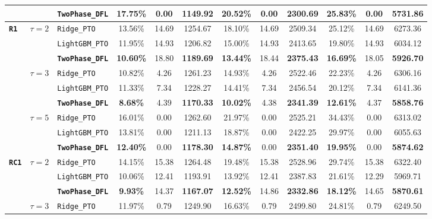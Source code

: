 \documentclass[11pt,a4paper]{article}
\theoremstyle{definition}
\theoremstyle{remark}
\begin{document}
\begin{table}[H]
{\begin{tabular}{@{}lllccccccccc@{}}
 & & \textbf{\texttt{TwoPhase\_DFL}} & \textbf{17.75\%} & 0.00 & \textbf{1149.92} & \textbf{20.52\%} & 0.00 & \textbf{2300.69} & \textbf{25.83\%} & 0.00 & \textbf{5731.86} \\
\midrule
\multirow{9}{*}{\textbf{\texttt{R1}}}
 & \multirow{3}{*}{$\tau = 2$}
 & \texttt{Ridge\_PTO} & 13.56\% & 14.69 & 1254.67 & 18.10\% & 14.69 & 2509.34 & 25.12\% & 14.69 & 6273.36 \\
 & & \texttt{LightGBM\_PTO} & 11.95\% & 14.93 & 1206.82 & 15.00\% & 14.93 & 2413.65 & 19.80\% & 14.93 & 6034.12 \\
 & & \textbf{\texttt{TwoPhase\_DFL}} & \textbf{10.60\%} & 18.80 & \textbf{1189.69} & \textbf{13.44\%} & 18.44 & \textbf{2375.43} & \textbf{16.69\%} & 18.05 & \textbf{5926.70} \\
\cmidrule(lr){2-12}
 & \multirow{3}{*}{$\tau = 3$}
 & \texttt{Ridge\_PTO} & 10.82\% & 4.26 & 1261.23 & 14.93\% & 4.26 & 2522.46 & 22.23\% & 4.26 & 6306.16 \\
 & & \texttt{LightGBM\_PTO} & 11.33\% & 7.34 & 1228.27 & 14.41\% & 7.34 & 2456.54 & 20.12\% & 7.34 & 6141.36 \\
 & & \textbf{\texttt{TwoPhase\_DFL}} & \textbf{8.68\%} & 4.39 & \textbf{1170.33} & \textbf{10.02\%} & 4.38 & \textbf{2341.39} & \textbf{12.61\%} & 4.37 & \textbf{5858.76} \\
\cmidrule(lr){2-12}
 & \multirow{3}{*}{$\tau = 5$}
 & \texttt{Ridge\_PTO} & 16.01\% & 0.00 & 1262.60 & 21.97\% & 0.00 & 2525.21 & 34.43\% & 0.00 & 6313.02 \\
 & & \texttt{LightGBM\_PTO} & 13.81\% & 0.00 & 1211.13 & 18.87\% & 0.00 & 2422.25 & 29.97\% & 0.00 & 6055.63 \\
 & & \textbf{\texttt{TwoPhase\_DFL}} & \textbf{12.40\%} & 0.00 & \textbf{1178.30} & \textbf{14.87\%} & 0.00 & \textbf{2351.40} & \textbf{19.95\%} & 0.00 & \textbf{5874.62} \\
\midrule
\multirow{9}{*}{\textbf{\texttt{RC1}}}
 & \multirow{3}{*}{$\tau = 2$}
 & \texttt{Ridge\_PTO} & 14.15\% & 15.38 & 1264.48 & 19.48\% & 15.38 & 2528.96 & 29.74\% & 15.38 & 6322.40 \\
 & & \texttt{LightGBM\_PTO} & 10.06\% & 12.41 & 1193.91 & 13.92\% & 12.41 & 2387.83 & 21.61\% & 12.29 & 5969.71 \\
 & & \textbf{\texttt{TwoPhase\_DFL}} & \textbf{9.93\%} & 14.37 & \textbf{1167.07} & \textbf{12.52\%} & 14.86 & \textbf{2332.86} & \textbf{18.12\%} & 14.65 & \textbf{5870.61} \\
\cmidrule(lr){2-12}
 & \multirow{3}{*}{$\tau = 3$}
 & \texttt{Ridge\_PTO} & 11.97\% & 0.79 & 1249.90 & 16.63\% & 0.79 & 2499.80 & 24.81\% & 0.79 & 6249.50 \\

\end{tabular}}
\end{table}
\end{document}

